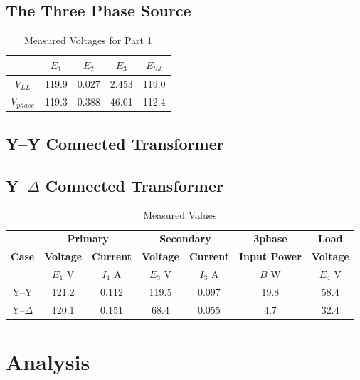 \documentclass{article}
\begin{document}
\subsection{The Three Phase Source}
\begin{table}[H]
  \centering
  \begin{tabular}{*{5}{c}}
    & \textbf{$E_1$} & \textbf{$E_2$} & \textbf{$E_3$} & \textbf{$E_{tot}$} \\

    \hline

    \textbf{$V_{LL}$} & 119.9 & 0.027 & 2.453 & 119.0 \\
    \textbf{$V_{phase}$} & 119.3 & 0.388 & 46.01 & 112.4 \\
  \end{tabular}
  \caption{Measured Voltages for Part 1}
  \label{tab:volt_rat}
\end{table}

\subsection{Y--Y Connected Transformer}

\subsection{Y--$\Delta$ Connected Transformer}

\begin{table}[H]
  \centering
  \begin{tabular}{*{7}{c}}
    & \multicolumn{2}{c}{\textbf{Primary}} &
    \multicolumn{2}{c}{\textbf{Secondary}} & \textbf{3phase} & \textbf{Load} \\

    \textbf{Case} & \textbf{Voltage} & \textbf{Current} & \textbf{Voltage} &
    \textbf{Current} & \textbf{Input Power} & \textbf{Voltage} \\

    & $E_1$ V & $I_1$ A & $E_3$ V & $I_3$ A & $B$ W & $E_4$ V \\

    \hline
    Y--Y        & 121.2 & 0.112 & 119.5 & 0.097 & 19.8 & 58.4 \\
    Y--$\Delta$ & 120.1 & 0.151 & 68.4 & 0.055 & 4.7 & 32.4 \\
  \end{tabular}
  \caption{Measured Values}
  \label{tab:results}
\end{table}
\section{Analysis}
\end{document}
